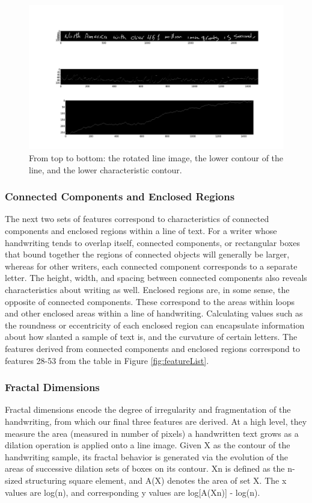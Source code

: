 \documentclass[paper=a4, fontsize=11pt]{scrartcl} %
\numberwithin{equation}{section} %
\numberwithin{figure}{section} %
\numberwithin{table}{section} %
\begin{document}
\begin{figure}
  \includegraphics{contourimage.png}
  \caption{From top to bottom: the rotated line image, the lower
    contour of the line, and the lower characteristic contour.}
  \label{fig:contourimage}
\end{figure}

\subsubsection{Connected Components and Enclosed Regions}
The next two sets of features correspond to characteristics of
connected components and enclosed regions within a line of text. For a
writer whose handwriting tends to overlap itself, connected
components, or rectangular boxes that bound together the regions of
connected objects will generally be larger, whereas for other writers,
each connected component corresponds to a separate letter. The height,
width, and spacing between connected components also reveals
characteristics about writing as well. Enclosed regions are, in some
sense, the opposite of connected components. These correspond to the
areas within loops and other enclosed areas within a line of
handwriting. Calculating values such as the roundness or eccentricity
of each enclosed region can encapsulate information about how slanted
a sample of text is, and the curvature of certain letters. The
features derived from connected components and enclosed regions
correspond to features 28-53 from the table in Figure
\ref{fig:featureList}.

\subsubsection{Fractal Dimensions}
Fractal dimensions encode the degree of irregularity and fragmentation
of the handwriting, from which our final three features are
derived\cite{FractalDimensions}. At a high level, they measure the
area (measured in number of pixels) a handwritten text grows as a
dilation operation is applied onto a line image. Given X as the
contour of the handwriting sample, its fractal behavior is generated
via the evolution of the areas of successive dilation sets of boxes on
its contour. Xn is defined as the n-sized structuring square element,
and A(X) denotes the area of set X. The x values are log(n), and
corresponding y values are log[A(Xn)] - log(n).
\end{document}
